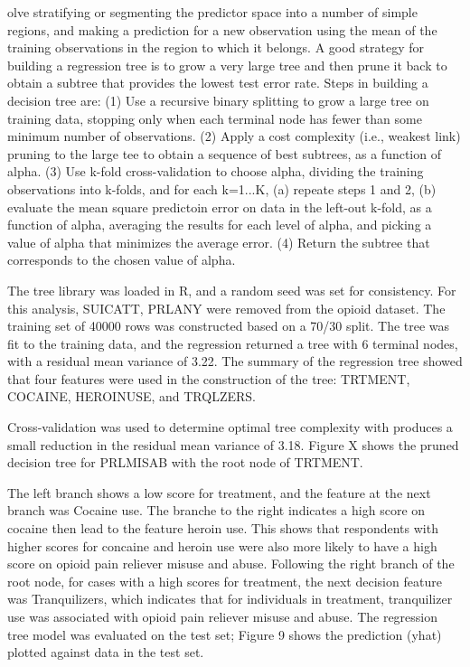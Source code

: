 \documentclass[sigconf]{acmart}
\begin{document}
olve stratifying or segmenting the
predictor space into a number of simple regions, and making a prediction for 
a new observation using the mean of the training observations in the region 
to which it belongs. A good strategy for building a regression tree is to
grow a very large tree and then prune it back to obtain a subtree that
provides the lowest test error rate. Steps in building a decision tree are:
(1) Use a recursive binary splitting to grow a large tree on training data, 
stopping only when each terminal node has fewer than some minimum number of 
observations. (2) Apply a cost complexity (i.e., weakest link) pruning  to 
the large tee to obtain a sequence of best subtrees, as a function of alpha. 
(3) Use k-fold cross-validation to choose alpha, dividing the training 
observations into k-folds, and for each k=1...K, (a) repeate steps 1 and 2,
(b) evaluate the mean square predictoin error on data in the left-out k-fold,
as a function of alpha, averaging the results for each level of alpha, and 
picking a value of alpha that minimizes the average error. (4) Return the 
subtree that corresponds to the chosen value of alpha. 

The tree library was loaded in R, and a random seed was set for consistency. 
For this analysis, SUICATT, PRLANY were removed from the opioid dataset. The 
training set of 40000 rows was constructed based on a 70/30 split. The tree
was fit to the training data, and the regression returned a tree with 6
terminal nodes, with a residual mean variance of 3.22. The summary of the 
regression tree showed that four features were used in the construction of 
the tree: TRTMENT, COCAINE, HEROINUSE, and TRQLZERS. 

Cross-validation 
was used to determine optimal tree complexity with produces a small reduction
in the residual mean variance of 3.18. Figure X shows the pruned decision tree 
for PRLMISAB with the root node of TRTMENT. 

The left branch shows a low 
score for treatment, and the feature at the next branch was Cocaine use. 
The branche to the right indicates a high score on cocaine then lead to 
the feature heroin use. This shows that respondents with higher scores for 
concaine and heroin use were also more likely to have a high score on 
opioid pain reliever misuse and abuse. Following the right branch of the 
root node, for cases with a high scores for treatment, the next decision 
feature was Tranquilizers, which indicates that for individuals in treatment, 
tranquilizer use was associated with opioid pain reliever misuse and abuse. 
The regression tree model was evaluated on the test set; Figure 9 shows 
the prediction (yhat) plotted against data in the test set.
\end{document}
